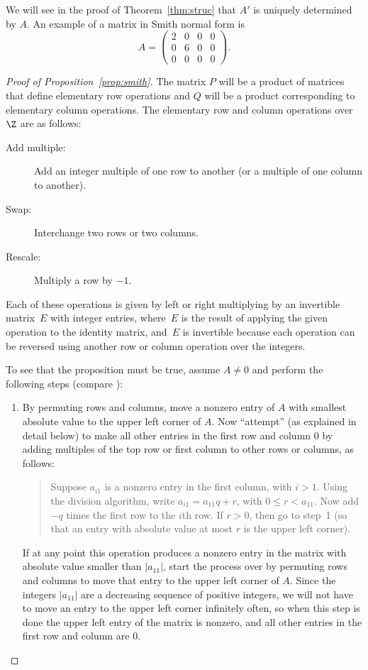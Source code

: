 We will see in the proof of Theorem~\ref{thm:struc} that
$A'$ is uniquely determined by $A$.
An example of a matrix in Smith normal form is
$$
	A=\left(\begin{matrix}
		2&0&0&0\\
		0&6&0&0\\
		0&0&0&0
	\end{matrix}\right).
$$

\begin{proof}[Proof of Proposition~\ref{prop:smith}]
The matrix $P$ will be a product of matrices that define elementary
row operations and $Q$ will be a product corresponding to elementary
column operations.  The elementary row and column operations over
$\Z$ are as follows:
\begin{description}
	\item[Add multiple:]
		Add an integer multiple of one row to another
		(or a multiple of one column to another).
	\item[Swap:]
		Interchange two rows or two columns.
	\item[Rescale:]
		Multiply a row by $-1$.
\end{description}
Each of these operations is given by left or right multiplying by an
invertible matrix~$E$ with integer entries, where~$E$ is the result of
applying the given operation to the identity matrix, and~$E$ is
invertible because each operation can be reversed using another row or
column operation over the integers.

To see that the proposition must be true, assume $A\neq 0$ and perform
the following steps (compare \cite[pg.~459]{artin:algebra}):
\begin{enumerate}
	\item By permuting rows and columns, move a nonzero entry of $A$ with
	smallest absolute value to the upper left corner of $A$.  Now
	``attempt'' (as explained in detail below) to make all other entries
	in the first row and column $0$ by adding multiples of the top row
	or first column to other rows or columns, as follows:
	\begin{quote}
		Suppose $a_{i1}$ is a nonzero entry in the first column, with
		$i>1$.  Using the division algorithm, write
		$a_{i1} = a_{11}q + r$, with $0\leq r < a_{11}$. Now add $-q$
		times the first row to the $i$th row. If $r>0$, then go to step~1
		(so that an entry with absolute value at most $r$ is the upper
		left corner).
	\end{quote}
	If at any point this operation produces a nonzero entry in the
	matrix with absolute value smaller than $|a_{11}|$, start the
	process over by permuting rows and columns to move that entry to the
	upper left corner of $A$.  Since the integers $|a_{11}|$ are a
	decreasing sequence of positive integers, we will not have to move
	an entry to the upper left corner infinitely often, so when this
	step is done the upper left entry of the matrix is nonzero, and all other         entries in the first row and column are $0$.
	

\end{enumerate}
\end{proof}
